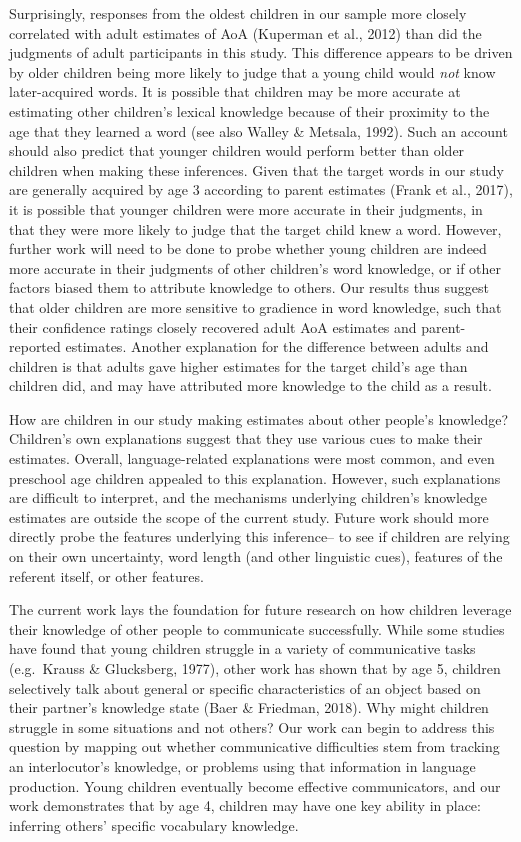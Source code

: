 \documentclass[10pt, letterpaper]{article}
\begin{document}
Surprisingly, responses from the oldest children in our sample more
closely correlated with adult estimates of AoA (Kuperman et al., 2012)
than did the judgments of adult participants in this study. This
difference appears to be driven by older children being more likely to
judge that a young child would \emph{not} know later-acquired words. It
is possible that children may be more accurate at estimating other
children's lexical knowledge because of their proximity to the age that
they learned a word (see also Walley \& Metsala, 1992). Such an account
should also predict that younger children would perform better than
older children when making these inferences. Given that the target words
in our study are generally acquired by age 3 according to parent
estimates (Frank et al., 2017), it is possible that younger children
were more accurate in their judgments, in that they were more likely to
judge that the target child knew a word. However, further work will need
to be done to probe whether young children are indeed more accurate in
their judgments of other children's word knowledge, or if other factors
biased them to attribute knowledge to others. Our results thus suggest
that older children are more sensitive to gradience in word knowledge,
such that their confidence ratings closely recovered adult AoA estimates
and parent-reported estimates. Another explanation for the difference
between adults and children is that adults gave higher estimates for the
target child's age than children did, and may have attributed more
knowledge to the child as a result.

How are children in our study making estimates about other people's
knowledge? Children's own explanations suggest that they use various
cues to make their estimates. Overall, language-related explanations
were most common, and even preschool age children appealed to this
explanation. However, such explanations are difficult to interpret, and
the mechanisms underlying children's knowledge estimates are outside the
scope of the current study. Future work should more directly probe the
features underlying this inference-- to see if children are relying on
their own uncertainty, word length (and other linguistic cues), features
of the referent itself, or other features.

The current work lays the foundation for future research on how children
leverage their knowledge of other people to communicate successfully.
While some studies have found that young children struggle in a variety
of communicative tasks (e.g.~Krauss \& Glucksberg, 1977), other work has
shown that by age 5, children selectively talk about general or specific
characteristics of an object based on their partner's knowledge state
(Baer \& Friedman, 2018). Why might children struggle in some situations
and not others? Our work can begin to address this question by mapping
out whether communicative difficulties stem from tracking an
interlocutor's knowledge, or problems using that information in language
production. Young children eventually become effective communicators,
and our work demonstrates that by age 4, children may have one key
ability in place: inferring others' specific vocabulary knowledge.
\end{document}
